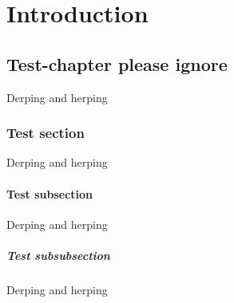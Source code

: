 \part{Introduction}
\chapter{Test-chapter please ignore}
Derping and herping
\section{Test section}
Derping and herping
\subsection{Test subsection}
Derping and herping
\subsubsection*{Test subsubsection}
Derping and herping